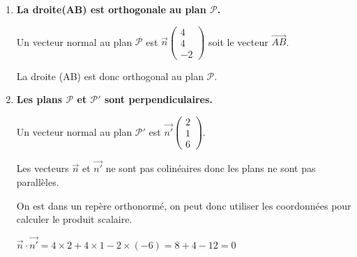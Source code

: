 \documentclass[10pt]{article}
\providecommand{\vect}[1]{\overrightarrow{#1}}
\begin{document}
\begin{enumerate}
$\begin{aligned} \begin{cases}- 3 + 2 s=-6+3t\\ 1 + 2s=1 \\ 4-s =9-5t\end{cases} & \iff \begin{cases}2 s -3t =-3\\ s=0 \\ s-5t=-5\end{cases} &
& \iff \begin{cases}-3t =-3\\ s=0 \\ -5t=-5\end{cases}
& \iff\begin{cases}t =1\\ s=0 \\ t=1\end{cases}\\
\end{aligned}$

Le système admet une unique solution donc les droites sont sécantes. 

\item \textbf{La droite(AB) est orthogonale au plan $\mathcal{P}$.}

Un vecteur normal au plan $\mathcal{P}$ est $\vect{n}\begin{pmatrix}4\\4\\-2\end{pmatrix}$ soit le vecteur $\vect{AB}$.

La droite (AB) est donc orthogonal au plan $\mathcal{P}$.

\item \textbf{Les plans $\mathcal{P}$ et $\mathcal{P}'$ sont perpendiculaires.}

Un vecteur normal au plan $\mathcal{P'}$ est $\vect{n'}\begin{pmatrix}
2\\1\\6
\end{pmatrix}$.

Les vecteurs $\vect{n}$ et $\vect{n'}$ ne sont pas colinéaires donc les plans ne sont pas parallèles.

On est dans un repère orthonormé, on peut donc utiliser les coordonnées pour calculer le produit scalaire.

$\vect{n} \cdot \vect{n'} = 4  \times 2+ 4\times 1-2 \times (-6) = 8+4-12=0$


\end{enumerate}
\end{document}
